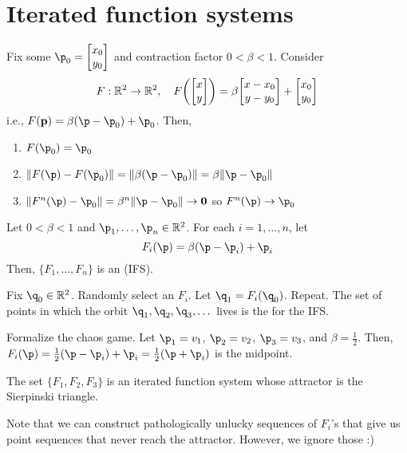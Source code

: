 \documentclass[class=pmath370,tikz,notes]{agony}
\begin{document}
\section{Iterated function systems}

Fix some $\p_0 = \mqty[x_0\\y_0]$ and contraction factor $0 < \beta < 1$. Consider
\[
  F : \R^2 \to \R^2 \qc F\qty(\mqty[x\\y]) = \beta\mqty[x-x_0\\y-y_0] + \mqty[x_0\\y_0]
\]
i.e., $F(\vb p) = \beta(\p - \p_0) + \p_0$. Then,
\begin{enumerate}[nosep]
  \item $F(\p_0) = \p_0$
  \item $\norm{F(\p) - F(\p_0)} = \norm{\beta(\p-\p_0)} = \beta\norm{\p-\p_0}$
  \item $\norm{F^n(\p) - \p_0} = \beta^n\norm{\p-\p_0} \to \vb 0$ so $F^n(\p) \to \p_0$
\end{enumerate}

\begin{defn}
  Let $0 < \beta < 1$ and $\p_1,\dotsc,\p_n \in \R^2$. For each $i = 1,\dotsc,n$, let
  \[ F_i(\p) = \beta(\p-\p_i) + \p_i \]
  Then, $\{F_1,\dotsc,F_n\}$ is an  (IFS).

  Fix $\q_0 \in \R^2$. Randomly select an $F_i$. Let $\q_1 = F_i(\q_0)$. Repeat.
  The set of points in which the orbit $\q_1,\q_2,\q_3,\dotsc$ lives
  is the  for the IFS.
\end{defn}

\begin{example}
  Formalize the chaos game. Let $\p_1 = v_1$, $\p_2 = v_2$, $\p_3 = v_3$, and $\beta = \frac12$.
  Then, $F_i(\p) = \frac12(\p-\p_i) + \p_i = \frac12(\p+\p_i)$ is the midpoint.

  The set $\{F_1,F_2,F_3\}$ is an iterated function system whose attractor
  is the Sierpinski triangle.
\end{example}

Note that we can construct pathologically unlucky sequences of $F_i$'s
that give us point sequences that never reach the attractor.
However, we ignore those :)
\end{document}
